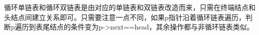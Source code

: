 {循环单链表和循环双链表是由对应的单链表和双链表改造而来，只需在终端结点和头结点间建立关系即可。{只需要注意一点不同，如果p指针沿着循环链表遍历，判断p遍历到表尾结点的条件变为p-\textgreater{}next==head}，其余操作都与非循环链表类似。}
